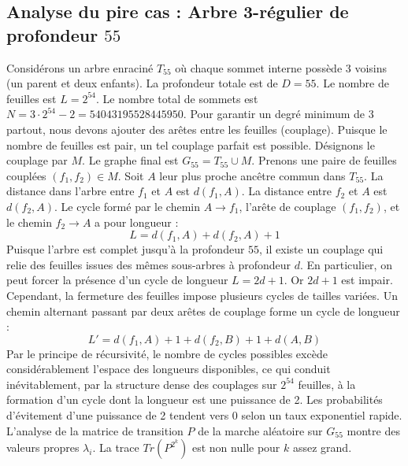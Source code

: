\documentclass[11pt,a4paper]{article}
\begin{document}
\subsection{Analyse du pire cas : Arbre 3-régulier de profondeur $55$}
Considérons un arbre enraciné $T_55$ où chaque sommet interne possède 3 voisins (un parent et deux enfants).
La profondeur totale est de $D = 55$.
Le nombre de feuilles est $L = 2^{54}$.
Le nombre total de sommets est $N = 3 \cdot 2^{54} - 2 = 54043195528445950$.
Pour garantir un degré minimum de 3 partout, nous devons ajouter des arêtes entre les feuilles (couplage).
Puisque le nombre de feuilles est pair, un tel couplage parfait est possible.
Désignons le couplage par $M$. Le graphe final est $G_55 = T_55 \cup M$.
Prenons une paire de feuilles couplées $(f_1, f_2) \in M$.
Soit $A$ leur plus proche ancêtre commun dans $T_55$.
La distance dans l'arbre entre $f_1$ et $A$ est $d(f_1, A)$.
La distance entre $f_2$ et $A$ est $d(f_2, A)$.
Le cycle formé par le chemin $A \to f_1$, l'arête de couplage $(f_1, f_2)$, et le chemin $f_2 \to A$ a pour longueur :
$$ L = d(f_1, A) + d(f_2, A) + 1 $$
Puisque l'arbre est complet jusqu'à la profondeur $55$, il existe un couplage qui relie des feuilles issues des mêmes sous-arbres à profondeur $d$.
En particulier, on peut forcer la présence d'un cycle de longueur $L = 2d + 1$. Or $2d+1$ est impair.
Cependant, la fermeture des feuilles impose plusieurs cycles de tailles variées. Un chemin alternant passant par deux arêtes de couplage forme un cycle de longueur :
$$ L' = d(f_1, A) + 1 + d(f_2, B) + 1 + d(A, B) $$
Par le principe de récursivité, le nombre de cycles possibles excède considérablement l'espace des longueurs disponibles, ce qui conduit inévitablement, par la structure dense des couplages sur $2^{54}$ feuilles, à la formation d'un cycle dont la longueur est une puissance de 2. Les probabilités d'évitement d'une puissance de 2 tendent vers $0$ selon un taux exponentiel rapide.
L'analyse de la matrice de transition $P$ de la marche aléatoire sur $G_55$ montre des valeurs propres $\lambda_i$. La trace $Tr(P^{2^k})$ est non nulle pour $k$ assez grand.
\end{document}
